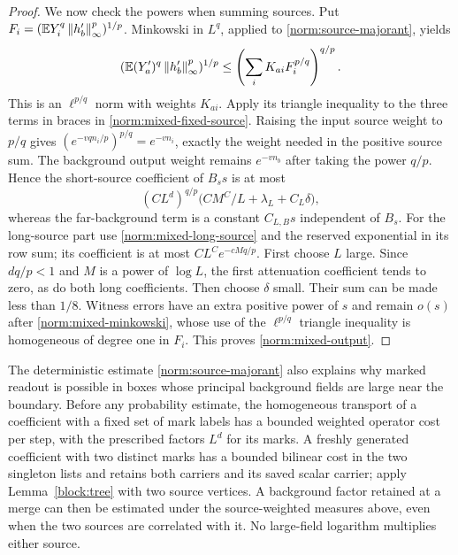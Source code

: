 \begin{proof}
We now check the powers when summing sources.  Put
$F_i=(\mathbb E Y_i^q\left\lVert h'_b\right\rVert_\infty^p)^{1/p}$.
Minkowski in $L^q$, applied to \eqref{norm:source-majorant}, yields
\begin{equation}\label{norm:mixed-minkowski}
 (\mathbb E (Y'_a)^q\left\lVert h'_b\right\rVert_\infty^p)^{1/p}
             \le \left(\sum_i K_{ai}F_i^{p/q}\right)^{q/p}.
\end{equation}
This is an $\ell^{p/q}$ norm with weights $K_{ai}$.  Apply its triangle
inequality to the three terms in braces in
\eqref{norm:mixed-fixed-source}.  Raising the input source weight to
$p/q$ gives $(e^{-vq n_i/p})^{p/q}=e^{-vn_i}$, exactly the weight needed in
the positive source sum.  The background output weight remains
$e^{-vn_b}$ after taking the power $q/p$.  Hence the short-source
coefficient of $B_s s$ is at most
\[
          (CL^d)^{q/p}\big(CM^C/L+\lambda_L+C_L\delta\big),
\]
whereas the far-background term is a constant $C_{L,B}s$ independent
of $B_s$.  For the long-source part use
\eqref{norm:mixed-long-source} and the reserved exponential in its
row sum; its coefficient is at most $CL^Ce^{-cM q/p}$.
First choose $L$ large.  Since $dq/p<1$ and $M$ is a power of $\log L$,
the first attenuation coefficient tends to zero, as do both long
coefficients.  Then choose $\delta$ small.  Their sum can be made less
than $1/8$.  Witness errors have an extra positive power of $s$ and
remain $o(s)$ after \eqref{norm:mixed-minkowski}, whose use of the
$\ell^{p/q}$ triangle inequality is homogeneous of degree one in $F_i$.
This proves \eqref{norm:mixed-output}.
\end{proof}

The deterministic estimate \eqref{norm:source-majorant} also explains
why marked readout is possible in boxes whose principal background
fields are large near the boundary.  Before any probability estimate,
the homogeneous transport of a coefficient with a fixed set of mark
labels has a bounded weighted operator cost per step, with the
prescribed factors $L^d$ for its marks.  A freshly generated coefficient
with two distinct marks has a bounded bilinear cost in the two singleton
lists and retains both carriers and its saved scalar carrier; apply
Lemma~\ref{block:tree} with two source vertices.
A background factor retained at a merge can then be estimated under
the source-weighted measures above, even when the two sources are
correlated with it.  No large-field logarithm multiplies either source.

